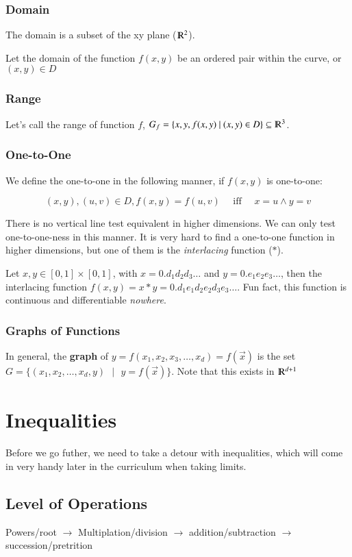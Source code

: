 \documentclass [12 pt, twoside] {book}
\newcommand\+{\text{ }}
\begin{document}
\subsubsection{Domain}
The domain is a subset of the xy plane ($\varmathbb{R}^2$).

Let the domain of the function $f(x, y)$ be an ordered pair within the curve, or
$(x, y) \in D$

\subsubsection{Range}

Let's call the range of function $f$, $G_f = \{x, y, f(x,y)\+|\+(x, y)
\in D\} \subseteq \varmathbb{R}^3$.

\subsubsection{One-to-One}
We define the one-to-one in the following manner, if $f(x, y)$ is one-to-one:

$$(x, y), (u, v) \in D, f(x, y) = f(u, v)\+\+\text{iff}\+\+x = u \wedge y = v$$

There is no vertical line test equivalent in higher dimensions. We can only test
one-to-one-ness in this manner. It is very hard to find a one-to-one function in
higher dimensions, but one of them is the \textit{interlacing} function ($*$).

Let $x, y \in [0, 1] \times [0, 1]$, with $x = 0.d_1d_2d_3\dots$ and $y =
0.e_1e_2e_3\dots$, then the interlacing function $f(x, y) = x * y =
0.d_1e_1d_2e_2d_3e_3\dots$. Fun fact, this function is continuous and
differentiable \textit{nowhere}.

\subsubsection{Graphs of Functions}
In general, the \textbf{graph} of $y = f(x_1, x_2, x_3, \dots, x_d) =
f(\vec{x})$ is the set $G = \{(x_1, x_2, \dots, x_d, y) \+|\+ y = f(\vec{x})\}$.
Note that this exists in $\varmathbb{R}^{d+1}$
\section{Inequalities}
Before we go futher, we need to take a detour with inequalities, which will
come in very handy later in the curriculum when taking limits.
\subsection{Level of Operations}
Powers/root $\to$ Multiplation/division $\to$ addition/subtraction $\to$
succession/pretrition
\end{document}
